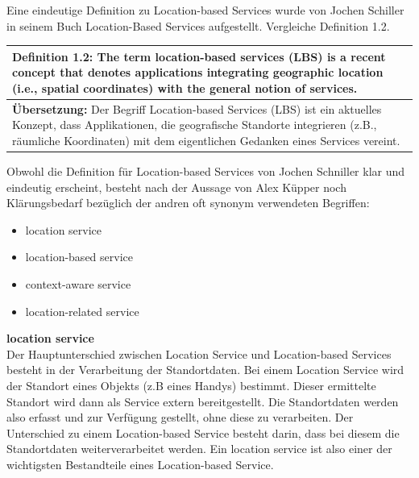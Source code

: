 Eine eindeutige Definition zu Location-based Services wurde von Jochen Schiller in seinem Buch \glqq Location-Based Services \grqq aufgestellt. Vergleiche Definition 1.2.

\begin{table}[h]
	\centering
	\begin{tabular}{|p{16cm}|}\hline
		\textbf{Definition 1.2:} \glqq The term location-based services (LBS) is a recent concept that denotes applications integrating geographic location (i.e., spatial coordinates) with the general notion of services. \grqq \cite[S.1]{Schiller2004}\\ \hline
		\textbf{Übersetzung:} Der Begriff Location-based Services (LBS) ist ein aktuelles Konzept, dass Applikationen, die geografische Standorte integrieren (z.B., räumliche Koordinaten) mit dem eigentlichen Gedanken eines Services vereint. \\ \hline
	\end{tabular}
\end{table}

Obwohl die Definition für Location-based Services von Jochen Schniller klar und eindeutig erscheint, besteht nach der Aussage von Alex Küpper noch Klärungsbedarf bezüglich der andren oft synonym verwendeten Begriffen:
\begin{itemize}
\item location service
\item location-based service
\item context-aware service
\item location-related service
\end{itemize}



\textbf{location service} \\
Der Hauptunterschied zwischen Location Service und Location-based Services besteht in der Verarbeitung der Standortdaten. Bei einem Location Service wird der Standort eines Objekts (z.B eines Handys) bestimmt. Dieser ermittelte Standort wird dann als Service extern bereitgestellt. Die Standortdaten werden also erfasst und zur Verfügung gestellt, ohne diese zu verarbeiten.
Der Unterschied zu einem Location-based Service besteht darin, dass bei diesem die Standortdaten weiterverarbeitet werden. Ein location service ist also einer der wichtigsten Bestandteile eines Location-based Service. %
\cite[S.1-2]{Kuepper2005}

